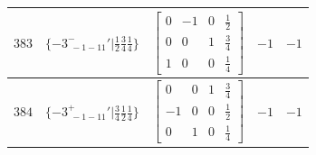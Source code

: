 \documentclass[fleqn,8pt]{jsarticle}
\begin{document}
\begin{longtable}{ccccc}
$ 383 $ & $ \{-3^{-}_{\,\,-1-11}{}'|\frac{1}{2} \frac{3}{4} \frac{1}{4}\} $ & $ \begin{bmatrix} 0 & -1 & 0 & \frac{1}{2} \\ 0 & 0 & 1 & \frac{3}{4} \\ 1 & 0 & 0 & \frac{1}{4} \end{bmatrix} $ & $ -1 $ & $ -1 $ \\ \hline
$ 384 $ & $ \{-3^{+}_{\,\,-1-11}{}'|\frac{3}{4} \frac{1}{2} \frac{1}{4}\} $ & $ \begin{bmatrix} 0 & 0 & 1 & \frac{3}{4} \\ -1 & 0 & 0 & \frac{1}{2} \\ 0 & 1 & 0 & \frac{1}{4} \end{bmatrix} $ & $ -1 $ & $ -1 $ \\
\end{longtable}
\end{document}
